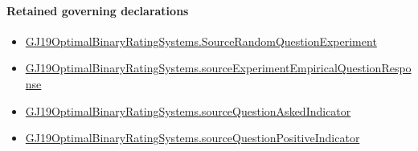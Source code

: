 \documentclass[10pt]{article}
\begin{document}
\paragraph{Retained governing declarations}
\begin{itemize}\raggedright
\item \hyperlink{paper-prerequisite-7a235f61a510cc28}{GJ19\allowbreak{}Optimal\allowbreak{}Binary\allowbreak{}Rating\allowbreak{}Systems.\allowbreak{}Source\allowbreak{}Random\allowbreak{}Question\allowbreak{}Experiment}
\item \hyperlink{paper-prerequisite-bb12d1c548870615}{GJ19\allowbreak{}Optimal\allowbreak{}Binary\allowbreak{}Rating\allowbreak{}Systems.\allowbreak{}source\allowbreak{}Experiment\allowbreak{}Empirical\allowbreak{}Question\allowbreak{}Response}
\item \hyperlink{governing-declaration-756fc6d8eb1da5bb}{GJ19\allowbreak{}Optimal\allowbreak{}Binary\allowbreak{}Rating\allowbreak{}Systems.\allowbreak{}source\allowbreak{}Question\allowbreak{}Asked\allowbreak{}Indicator}
\item \hyperlink{governing-declaration-ec4f87fcd48c433f}{GJ19\allowbreak{}Optimal\allowbreak{}Binary\allowbreak{}Rating\allowbreak{}Systems.\allowbreak{}source\allowbreak{}Question\allowbreak{}Positive\allowbreak{}Indicator}
\end{itemize}
\end{document}
